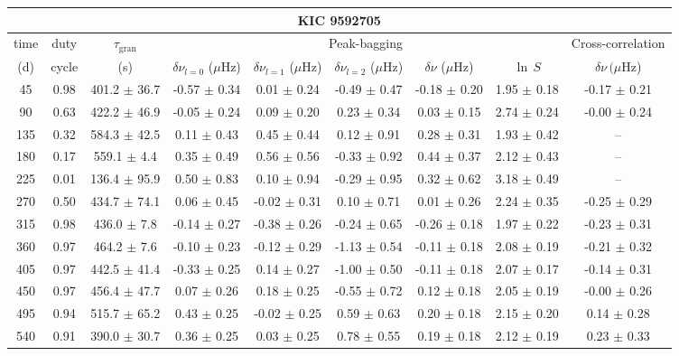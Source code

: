 \documentclass[twocolumn]{aastex61}%
\begin{document}
\begin{table*}[ht]\centering\fontsize{9.}{7.}\selectfont
\begin{tabular}{ccc|ccccc|c}
\multicolumn{9}{c}{KIC 9592705}\\ \hline\hline
time & duty & $\tau_\text{gran}$ &\multicolumn{5}{c|}{Peak-bagging}&Cross-correlation\\
(d)& cycle & (s)&$\delta\nu_{l=0}$ ($\mu$Hz) & $\delta\nu_{l=1}$ ($\mu$Hz) & $\delta\nu_{l=2}$ ($\mu$Hz) & $\delta\nu$ ($\mu$Hz)& $\ln\,S$ & $\delta\nu\,(\mu$Hz)\\\hline
45 & 0.98 & 401.2 $\pm$ 36.7 & -0.57 $\pm$ 0.34 & 0.01 $\pm$ 0.24 & -0.49 $\pm$ 0.47 & -0.18 $\pm$ 0.20 & 1.95 $\pm$ 0.18 & -0.17 $\pm$ 0.21\\
90 & 0.63 & 422.2 $\pm$ 46.9 & -0.05 $\pm$ 0.24 & 0.09 $\pm$ 0.20 & 0.23 $\pm$ 0.34 & 0.03 $\pm$ 0.15 & 2.74 $\pm$ 0.24 & -0.00 $\pm$ 0.24\\
135 & 0.32 & 584.3 $\pm$ 42.5 & 0.11 $\pm$ 0.43 & 0.45 $\pm$ 0.44 & 0.12 $\pm$ 0.91 & 0.28 $\pm$ 0.31 & 1.93 $\pm$ 0.42 & --\\
180 & 0.17 & 559.1 $\pm$ 4.4 & 0.35 $\pm$ 0.49 & 0.56 $\pm$ 0.56 & -0.33 $\pm$ 0.92 & 0.44 $\pm$ 0.37 & 2.12 $\pm$ 0.43 & --\\
225 & 0.01 & 136.4 $\pm$ 95.9 & 0.50 $\pm$ 0.83 & 0.10 $\pm$ 0.94 & -0.29 $\pm$ 0.95 & 0.32 $\pm$ 0.62 & 3.18 $\pm$ 0.49 & --\\
270 & 0.50 & 434.7 $\pm$ 74.1 & 0.06 $\pm$ 0.45 & -0.02 $\pm$ 0.31 & 0.10 $\pm$ 0.71 & 0.01 $\pm$ 0.26 & 2.24 $\pm$ 0.35 & -0.25 $\pm$ 0.29\\
315 & 0.98 & 436.0 $\pm$ 7.8 & -0.14 $\pm$ 0.27 & -0.38 $\pm$ 0.26 & -0.24 $\pm$ 0.65 & -0.26 $\pm$ 0.18 & 1.97 $\pm$ 0.22 & -0.23 $\pm$ 0.31\\
360 & 0.97 & 464.2 $\pm$ 7.6 & -0.10 $\pm$ 0.23 & -0.12 $\pm$ 0.29 & -1.13 $\pm$ 0.54 & -0.11 $\pm$ 0.18 & 2.08 $\pm$ 0.19 & -0.21 $\pm$ 0.32\\
405 & 0.97 & 442.5 $\pm$ 41.4 & -0.33 $\pm$ 0.25 & 0.14 $\pm$ 0.27 & -1.00 $\pm$ 0.50 & -0.11 $\pm$ 0.18 & 2.07 $\pm$ 0.17 & -0.14 $\pm$ 0.31\\
450 & 0.97 & 456.4 $\pm$ 47.7 & 0.07 $\pm$ 0.26 & 0.18 $\pm$ 0.25 & -0.55 $\pm$ 0.72 & 0.12 $\pm$ 0.18 & 2.05 $\pm$ 0.19 & -0.00 $\pm$ 0.26\\
495 & 0.94 & 515.7 $\pm$ 65.2 & 0.43 $\pm$ 0.25 & -0.02 $\pm$ 0.25 & 0.59 $\pm$ 0.63 & 0.20 $\pm$ 0.18 & 2.15 $\pm$ 0.20 & 0.14 $\pm$ 0.28\\
540 & 0.91 & 390.0 $\pm$ 30.7 & 0.36 $\pm$ 0.25 & 0.03 $\pm$ 0.25 & 0.78 $\pm$ 0.55 & 0.19 $\pm$ 0.18 & 2.12 $\pm$ 0.19 & 0.23 $\pm$ 0.33\\

\end{tabular}
\end{table*}
\end{document}
